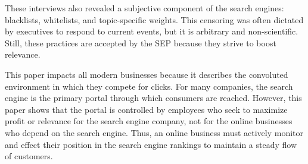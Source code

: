 \documentclass[../main-paper.tex]{subfiles}
\begin{document}
These interviews also revealed a subjective component of the search engines: blacklists, whitelists, and topic-specific weights. This censoring was often dictated by executives to respond to current events, but it is arbitrary and non-scientific. Still, these practices are accepted by the SEP because they strive to boost relevance.

This paper impacts all modern businesses because it describes the convoluted environment in which they compete for clicks. For many companies, the search engine is the primary portal through which consumers are reached. However, this paper shows that the portal is controlled by employees who seek to maximize profit or relevance for the search engine company, not for the online businesses who depend on the search engine. Thus, an online business must actively monitor and effect their position in the search engine rankings to maintain a steady flow of customers.
\end{document}
